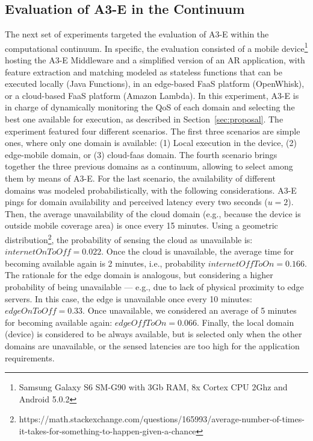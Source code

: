 
\subsection{Evaluation of A3-E in the Continuum} The next set of experiments targeted the evaluation of A3-E within the computational continuum. In specific, the evaluation consisted of a mobile device\footnote{Samsung Galaxy S6 SM-G90 with 3Gb RAM, 8x Cortex CPU 2Ghz and Android 5.0.2} hosting the A3-E Middleware and a simplified version of an AR application, with feature extraction and matching modeled as stateless functions that can be executed locally (Java Functions), in an edge-based FaaS platform (OpenWhisk), or a cloud-based FaaS platform (Amazon Lambda). In this experiment, A3-E is in charge of dynamically monitoring the QoS of each domain and selecting the best one available for execution, as described in Section~\ref{sec:proposal}.
The experiment featured four different scenarios. The first three scenarios are simple ones, where only one domain is available: (1) Local execution in the device, (2) edge-mobile domain, or (3) cloud-faas domain. The fourth scenario brings together the three previous domains as a continuum, allowing to select among them by means of A3-E. 
For the last scenario, the availability of different domains was modeled probabilistically, with the following considerations. A3-E pings for domain availability and perceived latency every two seconds ($u = 2$). Then, the average unavailability of the cloud domain (e.g., because the device is outside mobile coverage area) is once every 15 minutes. Using a geometric distribution\footnote{https://math.stackexchange.com/questions/165993/average-number-of-times-it-takes-for-something-to-happen-given-a-chance}, the probability of sensing the cloud as unavailable is: $internetOnToOff=0.022$. Once the cloud is unavailable, the average time for becoming available again is 2 minutes, i.e., probability $internetOffToOn=0.166$. The rationale for the edge domain is analogous, but considering a higher probability of being unavailable --- e.g., due to lack of physical proximity to edge servers. In this case, the edge is unavailable once every 10 minutes: $edgeOnToOff = 0.33$. Once unavailable, we considered an average of 5 minutes for becoming available again: $edgeOffToOn=0.066$. Finally, the local domain (device) is considered to be always available, but is selected only when the other domains are unavailable, or the sensed latencies are too high for the application requirements.


